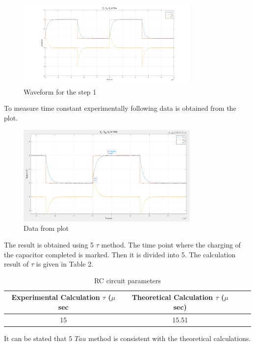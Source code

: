 \documentclass[letterpaper,12pt]{article}
\begin{document}
\begin{figure}[H]
	\centering
   \includegraphics[width=0.8\textwidth]{1a.png}
   \caption{Waveform for the step 1}
\end{figure} 
To measure time constant experimentally following data is obtained from the plot.
\begin{figure}[H]
	\centering
   \includegraphics[width=0.8\textwidth]{1_plot_data.png}
   \caption{Data from plot}
\end{figure} 
The result is obtained using 5 \(\tau\) method. The time point where the charging of the capacitor completed is marked. Then it is divided into 5. The calculation result of \(\tau\) is given in Table 2.
\begin{table}[H]
	\begin{center}
	\caption{RC circuit parameters}
	\vspace{2mm}
		\begin{tabular}{||c | c | c | c||} 
		 \hline
		 Experimental Calculation \(\tau\) (\(\mu\) sec & Theoretical Calculation \(\tau\) (\(\mu\) sec) \\ [0.5ex] 
		 \hline\hline
		 15 & 15.51 \\ 
		 \hline
	\end{tabular}
	\end{center}
	\end{table}
It can be stated that 5 \(Tau\) method is consistent with the theoretical calculations. \\
\end{document}
